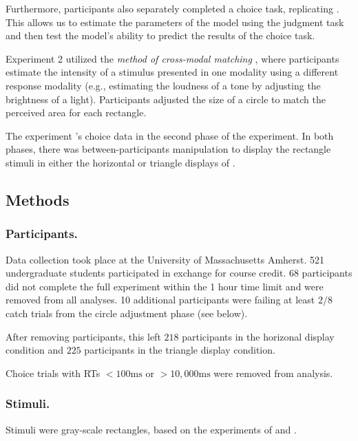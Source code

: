 Furthermore, participants also separately completed a choice task, replicating \textcite{spektorWhenGoodLooks2018b}. This allows us to estimate the parameters of the model using the judgment task and then test the model's ability to predict the results of the choice task. 

Experiment 2 utilized the \textit{method of cross-modal matching} \parencite{stevensCrossmodalityMatchingBrightness1965}, where participants estimate the intensity of a stimulus presented in one modality using a different response modality (e.g., estimating the loudness of a tone by adjusting the brightness of a light). Participants adjusted the size of a circle to match the perceived area for each rectangle. 

The experiment  \textcite{spektorWhenGoodLooks2018b}'s choice data in the second phase of the experiment. In both phases, there was between-participants manipulation to display the rectangle stimuli in either the horizontal or triangle displays of \textcite{spektorWhenGoodLooks2018b}.

\subsection{Methods}
\subsubsection{Participants.}
Data collection took place at the University of Massachusetts Amherst. 521 undergraduate students participated in exchange for course credit. 68 participants did not complete the full experiment within the 1 hour time limit and were removed from all analyses. 10 additional participants were failing at least $2/8$ catch trials from the circle adjustment phase (see below). 

After removing participants, this left $218$ participants in the horizonal display condition and $225$ participants in the triangle display condition. 

Choice trials with RTs $<100\text{ms}$ or $>10,000\text{ms}$ were removed from analysis.

\subsubsection{Stimuli.}
Stimuli were gray-scale rectangles, based on the experiments of \textcite{spektorWhenGoodLooks2018b} and \textcite{trueblood2013not}. 

